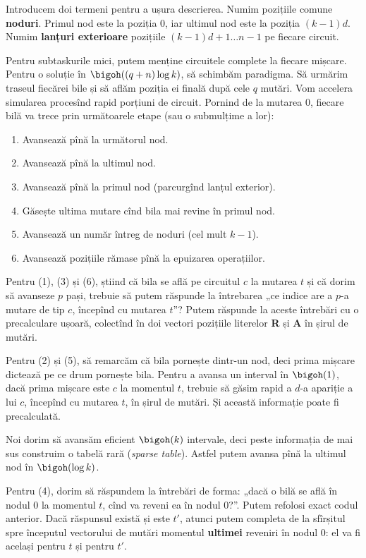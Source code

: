 Introducem doi termeni pentru a ușura descrierea. Numim pozițiile comune \textbf{noduri}. Primul nod este la poziția 0, iar ultimul nod este la poziția $(k-1)d$. Numim \textbf{lanțuri exterioare} pozițiile $(k-1)d + 1 \dots n - 1$ pe fiecare circuit.

Pentru subtaskurile mici, putem menține circuitele complete la fiecare mișcare. Pentru o soluție în $\bigoh((q + n) \log k)$, să schimbăm paradigma. Să urmărim traseul fiecărei bile și să aflăm poziția ei finală după cele $q$ mutări. Vom accelera simularea procesînd rapid porțiuni de circuit. Pornind de la mutarea 0, fiecare bilă va trece prin următoarele etape (sau o submulțime a lor):

\begin{enumerate}
  \item Avansează pînă la următorul nod.
  \item Avansează pînă la ultimul nod.
  \item Avansează pînă la primul nod (parcurgînd lanțul exterior).
  \item Găsește ultima mutare cînd bila mai revine în primul nod.
  \item Avansează un număr întreg de noduri (cel mult $k-1$).
  \item Avansează pozițiile rămase pînă la epuizarea operațiilor.
\end{enumerate}

Pentru (1), (3) și (6), știind că bila se află pe circuitul $c$ la mutarea $t$ și că dorim să avanseze $p$ pași, trebuie să putem răspunde la întrebarea „ce indice are a $p$-a mutare de tip $c$, începînd cu mutarea $t$”? Putem răspunde la aceste întrebări cu o precalculare ușoară, colectînd în doi vectori pozițiile literelor \textbf{R} și \textbf{A} în șirul de mutări.

Pentru (2) și (5), să remarcăm că bila pornește dintr-un nod, deci prima mișcare dictează pe ce drum pornește bila. Pentru a avansa un interval în $\bigoh(1)$, dacă prima mișcare este $c$ la momentul $t$, trebuie să găsim rapid a $d$-a apariție a lui $c$, începînd cu mutarea $t$, în șirul de mutări. Și această informație poate fi precalculată.

Noi dorim să avansăm eficient $\bigoh(k)$ intervale, deci peste informația de mai sus construim o tabelă rară (\textit{sparse table}). Astfel putem avansa pînă la ultimul nod în $\bigoh(\log k)$.

Pentru (4), dorim să răspundem la întrebări de forma: „dacă o bilă se află în nodul 0 la momentul $t$, cînd va reveni ea în nodul 0?”. Putem refolosi exact codul anterior. Dacă răspunsul există și este $t'$, atunci putem completa de la sfîrșitul spre începutul vectorului de mutări momentul \textbf{ultimei} reveniri în nodul 0: el va fi același pentru $t$ și pentru $t'$.

